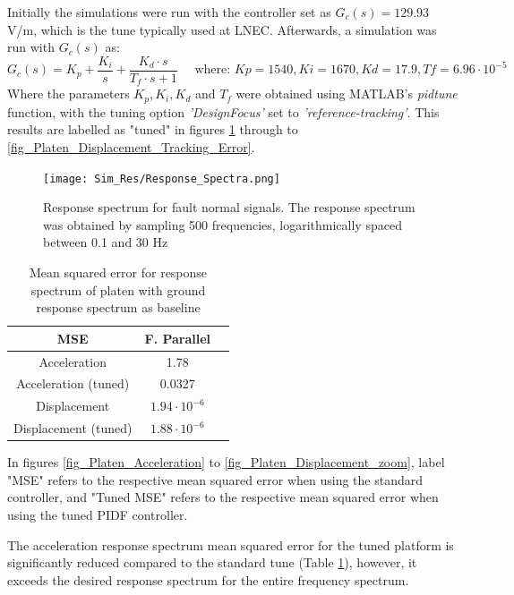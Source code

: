 \documentclass[9pt]{extarticle}
\begin{document}
Initially the simulations were run with the controller set as $G_c(s)=129.93$ V/m, which is the tune typically used at LNEC. Afterwards, a simulation was run with $G_c(s)$ as:
\begin{equation}
    G_c(s) = K_p +  \frac{K_i}{s} +  \frac{K_d\cdot s}{T_f\cdot s + 1} \quad \text{ where: $Kp = 1540, Ki = 1670, Kd = 17.9 , Tf = 6.96\cdot10^{-5}$}
\end{equation}
Where the parameters $K_p, K_i, K_d$ and $T_f$ were obtained using MATLAB's \textit{pidtune} function, with the tuning option \textit{'DesignFocus'} set to \textit{'reference-tracking'}. This results are labelled as "tuned" in figures \ref{fig_response_spectrum_of_3} through to \ref{fig_Platen_Displacement_Tracking_Error}.

\begin{figure}[H]
    \centering
    \texttt{[image: Sim\_Res/Response\_Spectra.png]}
    \caption{Response spectrum for fault normal signals. The response spectrum was obtained by sampling 500 frequencies, logarithmically spaced between 0.1 and 30 Hz}
    \label{fig_response_spectrum_of_3}
\end{figure}

\begin{table}[h]
    \centering
    \begin{tabular}{ccc}
        \hline
        MSE & F. Parallel  \\
        \hline
        Acceleration & 1.78  \\
        Acceleration (tuned) & 0.0327 \\
        \hline
        Displacement          & $1.94\cdot 10^{-6}$  \\
        Displacement (tuned)  & $1.88 \cdot 10^{-6}$  \\
        \hline
    \end{tabular}
    \caption{Mean squared error for response spectrum of platen with ground response spectrum as baseline }
    \label{tab:mse_rs}
\end{table}

In figures \ref{fig_Platen_Acceleration} to \ref{fig_Platen_Displacement_zoom}, label "MSE" refers to the  respective mean squared error when using the standard controller, and "Tuned MSE" refers to the respective mean squared error when using the tuned PIDF controller.

The acceleration response spectrum mean squared error for the tuned platform is significantly reduced compared to the standard tune (Table \ref{tab:mse_rs}), however, it exceeds the desired response spectrum for the entire frequency spectrum.
\end{document}
